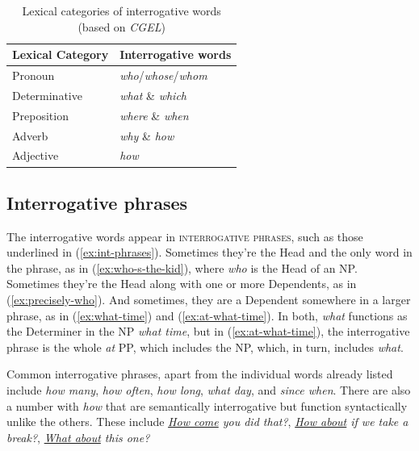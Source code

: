 \begin{table}[h]
    \centering
    \begin{tabular}{ll}
        \hline
        \textbf{Lexical Category} & \textbf{Interrogative words} \\
        \hline
        Pronoun & \textit{who}/\textit{whose}/\textit{whom} \\
        Determinative & \textit{what} \& \textit{which} \\
        Preposition & \textit{where} \& \textit{when} \\
        Adverb & \textit{why} \& \textit{how}\\
        Adjective & \textit{how}   \\
        \hline
        \end{tabular}
    \caption{Lexical categories of interrogative words (based on \textit{CGEL})} \label{tab:q-words}
\end{table}

\subsection{Interrogative phrases} \label{sec:interrogative-phrases}
The interrogative words appear in \textsc{interrogative phrases}, such as those underlined in (\ref{ex:int-phrases}). Sometimes they're the \textsf{Head} and the only word in the phrase, as in (\ref{ex:who-s-the-kid}), where \textit{who} is the \textsf{Head} of an NP. Sometimes they're the \textsf{Head} along with one or more \textsf{Dependents}, as in (\ref{ex:precisely-who}). And sometimes, they are a \textsf{Dependent} somewhere in a larger phrase, as in (\ref{ex:what-time}) and (\ref{ex:at-what-time}). In both, \textit{what} functions as the \textsf{Determiner} in the NP \textit{what time}, but in (\ref{ex:at-what-time}), the interrogative phrase is the whole \textit{at} PP, which includes the NP, which, in turn, includes \textit{what}.

\ea
    \label{ex:who-s-the-kid}
    \label{ex:precisely-who}
    \label{ex:what-time}
    \label{ex:at-what-time}
    \z\label{ex:int-phrases}
\z

Common interrogative phrases, apart from the individual words already listed include \textit{how many}, \textit{how often}, \textit{how long}, \textit{what day}, and \textit{since when}. There are also a number with \textit{how} that are semantically interrogative but function syntactically unlike the others. These include \textit{\uline{How come} you did that?}, \textit{\uline{How about} if we take a break?}, \textit{\uline{What about} this one?} 

